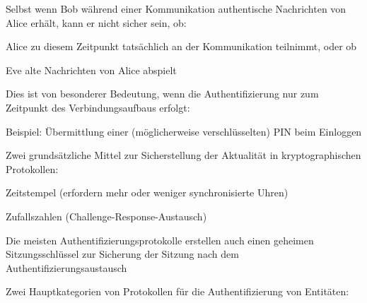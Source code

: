 \documentclass[a4paper]{article}
\begin{document}
\begin{multicols}{3}
\begin{itemize*}
            \begin{itemize*}
                  \item Selbst wenn Bob während einer Kommunikation authentische Nachrichten von Alice erhält, kann er nicht sicher sein, ob:
                  \begin{itemize*} \item Alice zu diesem Zeitpunkt tatsächlich an der Kommunikation teilnimmt, oder ob \item Eve alte Nachrichten von Alice abspielt \end{itemize*}
                  \item Dies ist von besonderer Bedeutung, wenn die Authentifizierung nur zum Zeitpunkt des Verbindungsaufbaus erfolgt:
                  \begin{itemize*} \item Beispiel: Übermittlung einer (möglicherweise verschlüsselten) PIN beim Einloggen \end{itemize*}
                  \item Zwei grundsätzliche Mittel zur Sicherstellung der Aktualität in kryptographischen Protokollen:
                  \begin{itemize*} \item Zeitstempel (erfordern mehr oder weniger synchronisierte Uhren) \item Zufallszahlen (Challenge-Response-Austausch) \end{itemize*}
            \end{itemize*}
            \item
            Die meisten Authentifizierungsprotokolle erstellen auch einen geheimen
            Sitzungsschlüssel zur Sicherung der Sitzung nach dem
            Authentifizierungsaustausch
            \item
            Zwei Hauptkategorien von Protokollen für die Authentifizierung von
            Entitäten:


\end{itemize*}
\end{multicols}
\end{document}
